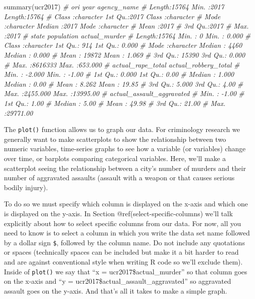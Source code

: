 \documentclass[
  a4paper,
]{krantz}
\makeatletter
\newenvironment{Shaded}{\begin{snugshade}}{\end{snugshade}}
\newcommand{\CommentTok}[1]{\textcolor[rgb]{0.56,0.35,0.01}{\textit{#1}}}
\newcommand{\FunctionTok}[1]{\textcolor[rgb]{0.00,0.00,0.00}{#1}}
\newcommand{\NormalTok}[1]{#1}
\newenvironment{kframe}{%
\medskip{}
\setlength{\fboxsep}{.8em}
 \def\at@end@of@kframe{}%
 \ifinner\ifhmode%
  \def\at@end@of@kframe{\end{minipage}}%
  \begin{minipage}{\columnwidth}%
 \fi\fi%
 \def\FrameCommand##1{\hskip\@totalleftmargin \hskip-\fboxsep
 \colorbox{shadecolor}{##1}\hskip-\fboxsep
     \hskip-\linewidth \hskip-\@totalleftmargin \hskip\columnwidth}%
 \MakeFramed {\advance\hsize-\width
   \@totalleftmargin\z@ \linewidth\hsize
   \@setminipage}}%
 {\par\unskip\endMakeFramed%
 \at@end@of@kframe}
\renewenvironment{Shaded}{\begin{kframe}}{\end{kframe}}
\makeatother
\begin{document}
\begin{Shaded}
\begin{Highlighting}[]
\FunctionTok{summary}\NormalTok{(ucr2017)}
\CommentTok{\#      ori                 year      agency\_name       }
\CommentTok{\#  Length:15764       Min.   :2017   Length:15764      }
\CommentTok{\#  Class :character   1st Qu.:2017   Class :character  }
\CommentTok{\#  Mode  :character   Median :2017   Mode  :character  }
\CommentTok{\#                     Mean   :2017                     }
\CommentTok{\#                     3rd Qu.:2017                     }
\CommentTok{\#                     Max.   :2017                     }
\CommentTok{\#     state             population      actual\_murder    }
\CommentTok{\#  Length:15764       Min.   :      0   Min.   :  0.000  }
\CommentTok{\#  Class :character   1st Qu.:    914   1st Qu.:  0.000  }
\CommentTok{\#  Mode  :character   Median :   4460   Median :  0.000  }
\CommentTok{\#                     Mean   :  19872   Mean   :  1.069  }
\CommentTok{\#                     3rd Qu.:  15390   3rd Qu.:  0.000  }
\CommentTok{\#                     Max.   :8616333   Max.   :653.000  }
\CommentTok{\#  actual\_rape\_total  actual\_robbery\_total}
\CommentTok{\#  Min.   :  {-}2.000   Min.   :   {-}1.00    }
\CommentTok{\#  1st Qu.:   0.000   1st Qu.:    0.00    }
\CommentTok{\#  Median :   1.000   Median :    0.00    }
\CommentTok{\#  Mean   :   8.262   Mean   :   19.85    }
\CommentTok{\#  3rd Qu.:   5.000   3rd Qu.:    4.00    }
\CommentTok{\#  Max.   :2455.000   Max.   :13995.00    }
\CommentTok{\#  actual\_assault\_aggravated}
\CommentTok{\#  Min.   :   {-}1.00         }
\CommentTok{\#  1st Qu.:    1.00         }
\CommentTok{\#  Median :    5.00         }
\CommentTok{\#  Mean   :   49.98         }
\CommentTok{\#  3rd Qu.:   21.00         }
\CommentTok{\#  Max.   :29771.00}
\end{Highlighting}
\end{Shaded}

The \texttt{plot()} function allows us to graph our data.
For criminology research we generally want to make
scatterplots to show the relationship between two numeric
variables, time-series graphs to see how a variable (or
variables) change over time, or barplots comparing
categorical variables. Here, we'll make a scatterplot seeing
the relationship between a city's number of murders and
their number of aggravated assaults (assault with a weapon
or that causes serious bodily injury).

To do so we must specify which column is displayed on the
x-axis and which one is displayed on the y-axis. In Section
@ref(select-specific-columns) we'll talk explicitly about
how to select specific columns from our data. For now, all
you need to know is to select a column in which you write
the data set name followed by a dollar sign \texttt{\$},
followed by the column name. Do not include any quotations
or spaces (technically spaces can be included but make it a
bit harder to read and are against conventional style when
writing R code so we'll exclude them). Inside of
\texttt{plot()} we say that ``x = ucr2017\$actual\_murder''
so that column goes on the x-axis and ``y =
ucr2017\$actual\_assault\_aggravated'' so aggravated assault
goes on the y-axis. And that's all it takes to make a simple
graph.
\end{document}
